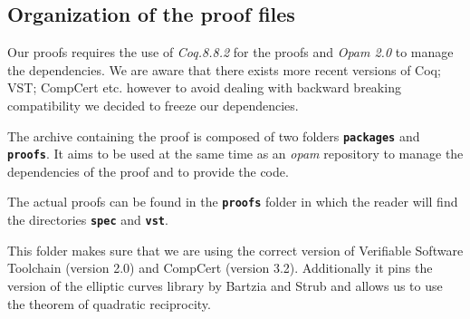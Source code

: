 \subsection{Organization of the proof files}
\label{appendix:proof-folders}

Our proofs requires the use of \emph{Coq.8.8.2} for the proofs and
\emph{Opam 2.0} to manage the dependencies. We are aware that there exists more
recent versions of Coq; VST; CompCert etc. however to avoid dealing with backward
breaking compatibility we decided to freeze our dependencies.

The archive containing the proof is composed of two folders \textbf{\texttt{packages}}
and \textbf{\texttt{proofs}}.
It aims to be used at the same time as an \emph{opam} repository to manage
the dependencies of the proof and to provide the code.

The actual proofs can be found in the \textbf{\texttt{proofs}} folder in which
the reader will find the directories \textbf{\texttt{spec}} and \textbf{\texttt{vst}}.

This folder makes sure that we are using the correct version of
Verifiable Software Toolchain (version 2.0) and CompCert (version 3.2).
Additionally it pins the version of the elliptic curves library by Bartzia and Strub
and allows us to use the theorem of quadratic reciprocity.

